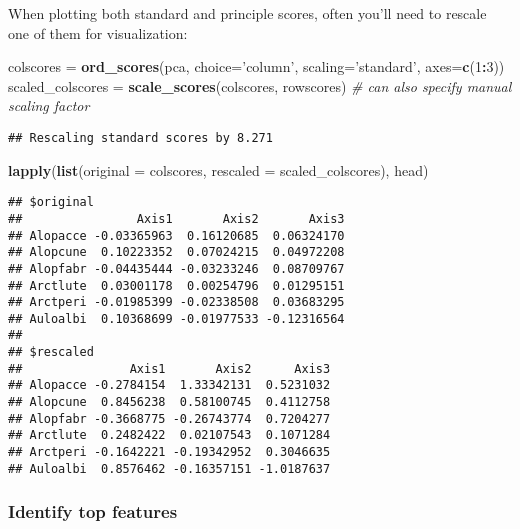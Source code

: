 \documentclass[
]{article}
\newenvironment{Shaded}{\begin{snugshade}}{\end{snugshade}}
\newcommand{\CommentTok}[1]{\textcolor[rgb]{0.56,0.35,0.01}{\textit{#1}}}
\newcommand{\DataTypeTok}[1]{\textcolor[rgb]{0.13,0.29,0.53}{#1}}
\newcommand{\DecValTok}[1]{\textcolor[rgb]{0.00,0.00,0.81}{#1}}
\newcommand{\KeywordTok}[1]{\textcolor[rgb]{0.13,0.29,0.53}{\textbf{#1}}}
\newcommand{\NormalTok}[1]{#1}
\newcommand{\OperatorTok}[1]{\textcolor[rgb]{0.81,0.36,0.00}{\textbf{#1}}}
\newcommand{\StringTok}[1]{\textcolor[rgb]{0.31,0.60,0.02}{#1}}
\begin{document}
When plotting both standard and principle scores, often you'll need to
rescale one of them for visualization:

\begin{Shaded}
\begin{Highlighting}[]
\NormalTok{colscores =}\StringTok{ }\KeywordTok{ord_scores}\NormalTok{(pca, }
                       \DataTypeTok{choice=}\StringTok{'column'}\NormalTok{, }
                       \DataTypeTok{scaling=}\StringTok{'standard'}\NormalTok{, }
                       \DataTypeTok{axes=}\KeywordTok{c}\NormalTok{(}\DecValTok{1}\OperatorTok{:}\DecValTok{3}\NormalTok{))}
\NormalTok{scaled_colscores =}\StringTok{ }\KeywordTok{scale_scores}\NormalTok{(colscores, }
\NormalTok{                                rowscores) }\CommentTok{# can also specify manual scaling factor}
\end{Highlighting}
\end{Shaded}

\begin{verbatim}
## Rescaling standard scores by 8.271
\end{verbatim}

\begin{Shaded}
\begin{Highlighting}[]
\KeywordTok{lapply}\NormalTok{(}\KeywordTok{list}\NormalTok{(}\DataTypeTok{original =}\NormalTok{ colscores, }
            \DataTypeTok{rescaled =}\NormalTok{ scaled_colscores), }
\NormalTok{       head)}
\end{Highlighting}
\end{Shaded}

\begin{verbatim}
## $original
##                Axis1       Axis2       Axis3
## Alopacce -0.03365963  0.16120685  0.06324170
## Alopcune  0.10223352  0.07024215  0.04972208
## Alopfabr -0.04435444 -0.03233246  0.08709767
## Arctlute  0.03001178  0.00254796  0.01295151
## Arctperi -0.01985399 -0.02338508  0.03683295
## Auloalbi  0.10368699 -0.01977533 -0.12316564
## 
## $rescaled
##               Axis1       Axis2      Axis3
## Alopacce -0.2784154  1.33342131  0.5231032
## Alopcune  0.8456238  0.58100745  0.4112758
## Alopfabr -0.3668775 -0.26743774  0.7204277
## Arctlute  0.2482422  0.02107543  0.1071284
## Arctperi -0.1642221 -0.19342952  0.3046635
## Auloalbi  0.8576462 -0.16357151 -1.0187637
\end{verbatim}

\hypertarget{identify-top-features}{%
\subsubsection{Identify top features}\label{identify-top-features}}
\end{document}
